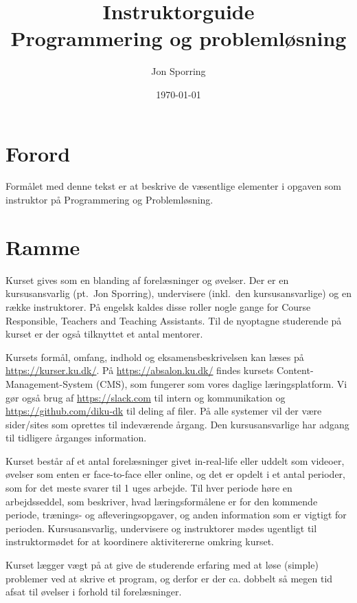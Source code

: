 \documentclass[a4paper]{article}
\title{Instruktorguide\\Programmering og problemløsning}
\author{Jon Sporring}
\date{\today}
\begin{document}
\maketitle

\section{Forord}
Formålet med denne tekst er at beskrive de væsentlige elementer i
opgaven som instruktor på Programmering og Problemløsning.

\section{Ramme}
Kurset gives som en blanding af forelæsninger og øvelser. Der er en
kursusansvarlig (pt.\ Jon Sporring), undervisere (inkl.\ den
kursusansvarlige) og en række instruktorer. På engelsk kaldes disse
roller nogle gange for Course Responsible, Teachers and Teaching
Assistants. Til de nyoptagne studerende på kurset er der også
tilknyttet et antal mentorer.

Kursets formål, omfang, indhold og eksamensbeskrivelsen kan læses på
\url{https://kurser.ku.dk/}. På \url{https://absalon.ku.dk/} findes
kursets Content-Management-System (CMS), som fungerer som vores
daglige læringsplatform. Vi gør også brug af \url{https://slack.com}
til intern og kommunikation og \url{https://github.com/diku-dk} til
deling af filer. På alle systemer vil der være sider/sites som
oprettes til indeværende årgang. Den kursusansvarlige har adgang til
tidligere årganges information.

Kurset består af et antal forelæsninger givet in-real-life eller
uddelt som videoer, øvelser som enten er face-to-face eller online, og
det er opdelt i et antal perioder, som for det meste svarer til 1 uges
arbejde. Til hver periode høre en arbejdsseddel, som beskriver, hvad
læringsformålene er for den kommende periode, trænings- og
afleveringsopgaver, og anden information som er vigtigt for
perioden. Kursusansvarlig, undervisere og instruktorer mødes ugentligt
til instruktormødet for at koordinere aktivitererne omkring kurset.

Kurset lægger vægt på at give de studerende erfaring med at løse
(simple) problemer ved at skrive et program, og derfor er der
ca. dobbelt så megen tid afsat til øvelser i forhold til
forelæsninger.
\end{document}

